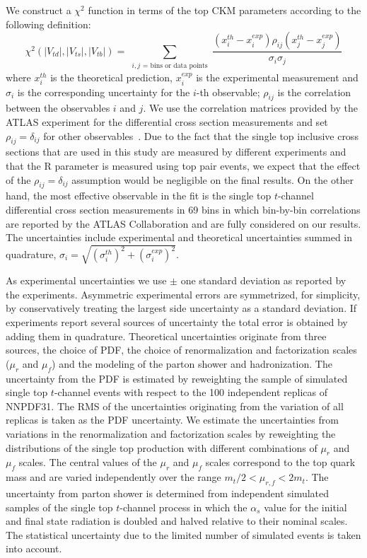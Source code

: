 \documentclass[11pt]{article}
\newcommand{\VTD}{|V_{td}|}
\newcommand{\VTS}{|V_{ts}|}
\newcommand{\VTB}{|V_{tb}|}
\begin{document}
We construct a $\chi^2$ function in terms of the top CKM parameters according to the following definition:
\begin{equation}
\label{chi}
  \chi^2(\VTD,\VTS,\VTB) =  \sum_{\substack{i,j \text{ = bins or data points}} } \frac{(x_i^{th} - x_i^{exp})\rho_{ij}(x_j^{th} - x_j^{exp})}{\sigma_i \sigma_j}
\end{equation}
where $x_i^{th}$ is  the theoretical prediction, $x_i^{exp}$ is the experimental measurement and $\sigma_i$ is the corresponding uncertainty for the $i$-th observable; $\rho_{ij}$ is the correlation between
the  observables $i$ and $j$. We use the correlation matrices provided by the ATLAS experiment for the differential cross section measurements and set $\rho_{ij} = \delta_{ij}$ for other observables~\cite{Buckley:2015lku}.
Due to the fact that the single top inclusive cross sections that are used in this study are measured by different experiments and that the R parameter  is measured using top pair events, we expect that the effect of the   $\rho_{ij} = \delta_{ij}$ assumption would be negligible on the final results. On the other hand, the most effective observable in the fit is the single top $t$-channel differential cross section measurements in 69 bins in which bin-by-bin correlations are reported by the ATLAS  Collaboration and are fully considered on our results.
The uncertainties include experimental and theoretical uncertainties summed in quadrature, $\sigma_i=\sqrt{(\sigma_i^{th})^2+(\sigma_i^{exp})^2}$.

As experimental uncertainties we use $\pm$ one standard deviation as reported by the experiments. Asymmetric experimental errors are symmetrized, for simplicity, by conservatively treating the largest side uncertainty as a standard deviation. If experiments report  several sources of uncertainty the total error is obtained by adding them in quadrature.
Theoretical uncertainties originate from three sources, the choice of PDF, the choice of renormalization and factorization scales ($\mu_r$ and $\mu_f$) and the modeling of the parton shower and hadronization.
The  uncertainty  from  the  PDF  is  estimated  by reweighting the sample of
simulated single top $t$-channel events with respect to the  100  independent  replicas  of NNPDF31.
The  RMS  of  the  uncertainties  originating  from  the  variation  of all  replicas  is  taken  as  the  PDF uncertainty.
We estimate the uncertainties from variations in the renormalization and factorization scales  by reweighting the distributions of the single top production with different combinations of  $\mu_r$ and $\mu_f$ scales. The  central  values  of  the $\mu_r$ and $\mu_f$ scales correspond to the top quark mass and are varied independently over the range $m_t/2<\mu_{r,f}<2m_t$.
The uncertainty from parton shower is determined from independent simulated samples of the single top $t$-channel process in which the $\alpha_s$ value for the initial  and final state radiation is doubled and halved relative to their nominal scales.
The statistical uncertainty due to the limited number of  simulated events is taken into account.
\end{document}
